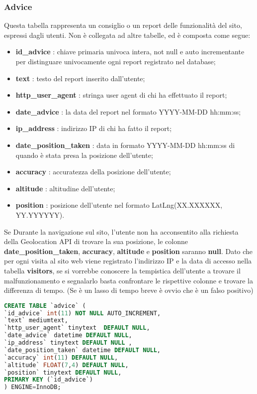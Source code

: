 \subsubsection{Advice}
Questa tabella rappresenta un consiglio o un report delle funzionalità del sito, espressi dagli utenti. Non è collegata ad altre tabelle, ed è composta come segue: 
\begin{itemize}
\item \textbf{id\_advice} : chiave primaria univoca intera, not null e auto incrementante per distinguare univocamente ogni report registrato nel database;
\item \textbf{text} : testo del report inserito dall'utente;
\item \textbf{http\_user\_agent} : stringa user agent di chi ha effettuato il report;
\item \textbf{date\_advice} : la data del report nel formato YYYY-MM-DD hh:mm:ss;
\item \textbf{ip\_address} : indirizzo IP di chi ha fatto il report;
\item \textbf{date\_position\_taken} : data in formato YYYY-MM-DD hh:mm:ss di quando è stata presa la posizione dell'utente;
\item \textbf{accuracy} : accuratezza della posizione dell'utente;
\item \textbf{altitude} : altitudine dell'utente;
\item \textbf{position} : posizione dell'utente nel formato \newline LatLng(XX.XXXXXX, YY.YYYYYY).
\end{itemize}
Se Durante la navigazione sul sito, l'utente non ha acconsentito alla richiesta della Geolocation API di trovare la sua posizione, le colonne \textbf{date\_position\_taken}, \textbf{accuracy}, \textbf{altitude} e \textbf{position} saranno \textbf{null}. \newline
Dato che per ogni visita al sito web viene registrato l'indirizzo IP e la data di accesso nella tabella \textbf{visitors}, se si vorrebbe conoscere la tempistica dell'utente a trovare il malfunzionamento e segnalarlo basta confrontare le rispettive colonne e trovare la differenza di tempo. (Se è un lasso di tempo breve è ovvio che è un falso positivo)


\begin{lstlisting}[language=SQL, caption=Codice SQL della Tabella Advice]
CREATE TABLE `advice` (
`id_advice` int(11) NOT NULL AUTO_INCREMENT,
`text` mediumtext,
`http_user_agent` tinytext  DEFAULT NULL,
`date_advice` datetime DEFAULT NULL,
`ip_address` tinytext DEFAULT NULL ,
`date_position_taken` datetime DEFAULT NULL,
`accuracy` int(11) DEFAULT NULL,
`altitude` FLOAT(7,4) DEFAULT NULL,
`position` tinytext DEFAULT NULL,
PRIMARY KEY (`id_advice`)
) ENGINE=InnoDB;

\end{lstlisting}


